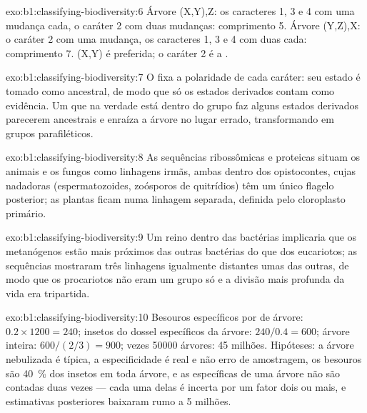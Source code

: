 \begin{solution}{exo:b1:classifying-biodiversity:6}
Árvore (X,Y),Z: os caracteres 1, 3 e 4 com uma mudança cada, o caráter
2 com duas mudanças: comprimento 5. Árvore (Y,Z),X: o caráter 2 com
uma mudança, os caracteres 1, 3 e 4 com duas cada: comprimento 7.
(X,Y) é preferida; o caráter 2 é a .
\end{solution}

\begin{solution}{exo:b1:classifying-biodiversity:7}
O  fixa a polaridade de cada caráter: seu estado é tomado
como ancestral, de modo que só os estados derivados contam como
evidência. Um  que na verdade está dentro do grupo faz
alguns estados derivados parecerem ancestrais e enraíza a árvore no
lugar errado, transformando  em grupos parafiléticos.
\end{solution}

\begin{solution}{exo:b1:classifying-biodiversity:8}
As sequências ribossômicas e proteicas situam os animais e os fungos
como linhagens irmãs, ambas dentro dos opistocontes, cujas 
nadadoras (espermatozoides, zoósporos de quitrídios) têm um único
flagelo posterior; as plantas ficam numa linhagem separada, definida
pelo cloroplasto primário.
\end{solution}

\begin{solution}{exo:b1:classifying-biodiversity:9}
Um reino dentro das bactérias implicaria que os metanógenos estão mais
próximos das outras bactérias do que dos eucariotos; as sequências
mostraram três linhagens igualmente distantes umas das outras, de modo
que os procariotos não eram um grupo só e a divisão mais profunda da
vida era tripartida.
\end{solution}

\begin{solution}{exo:b1:classifying-biodiversity:10}
Besouros específicos por  de árvore: $0.2\times 1200 = 240$;
insetos do dossel específicos da árvore: $240/0.4 = 600$; árvore
inteira: $600/(2/3) = 900$; vezes \num{50000} árvores: \num{45}
milhões. Hipóteses: a árvore nebulizada é típica, a especificidade é
real e não erro de amostragem, os besouros são \qty{40}{\%} dos
insetos em toda árvore, e as  específicas de uma árvore não
são contadas duas vezes --- cada uma delas é incerta por um fator dois
ou mais, e estimativas posteriores baixaram rumo a \num{5} milhões.
\end{solution}

